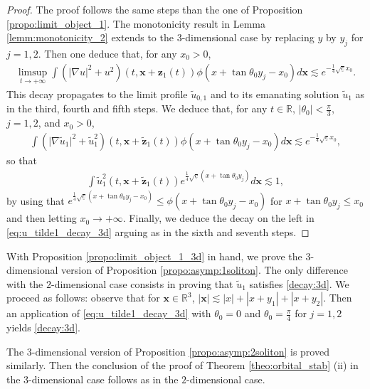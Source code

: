 \documentclass[reqno,10pt]{amsart}
\numberwithin{equation}{section}
\newcommand{\bx}{\mathbf{x}}
\newcommand{\bz}{\mathbf{z}}
\begin{document}
 \begin{proof}The proof follows the same steps than the one of Proposition \ref{propo:limit_object_1}. The monotonicity result in Lemma \ref{lemm:monotonicity_2} extends to the $3$-dimensional case by replacing $y$ by $y_j$ for $j=1,2$. Then one deduce that, for any $x_0>0$, 
 \begin{align*}
		\limsup_{t\rightarrow + \infty} \int \left( \vert \nabla u \vert^2 + u^2 \right) \left(t, \bx + \bz_1(t) \right) \phi \left( x+\tan{\theta_0}y_j- x_0 \right) d\bx \lesssim e^{- \frac14 \sqrt{\underline{c}} x_0}.
\end{align*}
This decay propagates to the limit profile $\tilde{u}_{0,1}$ and to its emanating solution $\tilde{u}_1$  as in the third, fourth and fifth steps. We deduce that, for any $t \in \mathbb R$, $|\theta_0|<\frac{\pi}3$, $j=1,2$, and $x_0>0$,
\begin{align*}
		 \int \left( \vert \nabla \tilde{u}_1 \vert^2 + \tilde{u}_1^2 \right) \left(t, \bx + \tilde{\bz}_1(t) \right) \phi \left( x+\tan{\theta_0}y_j- x_0 \right) d\bx \lesssim e^{- \frac14 \sqrt{\underline{c}} x_0} , 
\end{align*}
so that 
\begin{align*}
    \int \tilde{u}_1^2  \left( t, \bx + \tilde{\bz}_1(t) \right) e^{\frac14\sqrt{\underline{c}}(x+\tan{\theta_0}y_j)} d\bx \lesssim 1, 
\end{align*} 
by using that $e^{\frac14\sqrt{\underline{c}}(x+\tan{\theta_0}y_j-x_0)} \le \phi(x+\tan{\theta_0}y_j-x_0)$ for $x+\tan{\theta_0}y_j \le x_0$ and then letting $x_0 \to +\infty$. Finally, we deduce the decay on the left in \eqref{eq:u_tilde1_decay_3d} arguing as in the sixth and seventh steps. 
 \end{proof}

 With Proposition \ref{propo:limit_object_1_3d} in hand, we prove the $3$-dimensional version of Proposition \ref{propo:asymp:1soliton}. The only difference with the $2$-dimensional case consists in proving that $\tilde{u}_1$ satisfies \eqref{decay:3d}. We proceed as follows: observe that for $\bx \in \mathbb R^3$, $|\bx| \lesssim |x|+|x+y_1|+|x+y_2|$. Then an application of \eqref{eq:u_tilde1_decay_3d} with $\theta_0=0$ and $\theta_0=\frac{\pi}4$ for $j=1,2$ yields \eqref{decay:3d}. 

 The $3$-dimensional version of Proposition \ref{propo:asymp:2soliton} is proved similarly. Then the conclusion of the proof of Theorem \ref{theo:orbital_stab} (ii) in the $3$-dimensional case follows as in the $2$-dimensional case. 
 
\end{document}
